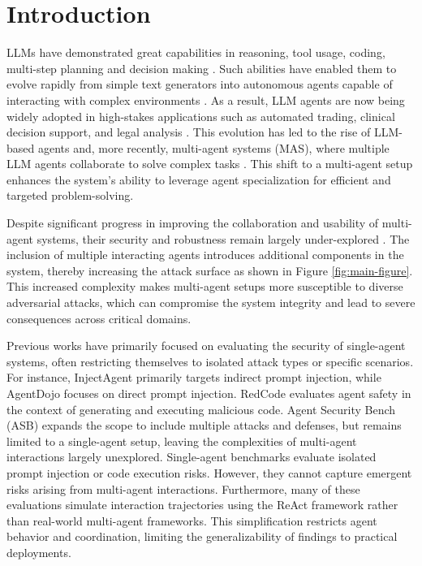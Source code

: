 \section{Introduction}

LLMs have demonstrated great capabilities in  reasoning, tool usage, coding, multi-step planning and decision making \citep{Masterman2024TheLO, wu2023autogen}. Such abilities have enabled them to evolve rapidly from simple text generators into autonomous agents capable of interacting with complex environments \citep{li2024personalllmagentsinsights,liu2025advanceschallengesfoundationagents,schick2023toolformerlanguagemodelsteach}.  As a result, LLM agents are now being widely adopted in high-stakes applications such as automated trading, clinical decision support, and legal analysis \citep{10.1145/3677052.3698688, 10822186, li2024legalagentbenchevaluatingllmagents}. This evolution has led to the rise of LLM-based agents and, more recently, multi-agent systems (MAS), where multiple LLM agents collaborate to solve complex tasks \citep{article, 10546975}. This shift to a multi-agent setup enhances the system’s ability to leverage agent specialization for efficient and targeted problem-solving.

Despite significant progress in improving the collaboration and usability of multi-agent systems, their security and robustness remain largely under-explored \citep{hammond2025multiagentrisksadvancedai}. The inclusion of multiple interacting agents introduces additional components in the system, thereby increasing the attack surface as shown in Figure \ref{fig:main-figure}. This increased complexity makes multi-agent setups more susceptible to diverse adversarial attacks, which can compromise the system integrity and lead to severe consequences across critical domains.

Previous works \citep{zhang2025agentsecuritybenchasb, ruan2024identifyingriskslmagents} have primarily focused on evaluating the security of single-agent systems, often restricting themselves to isolated attack types or specific scenarios. For instance, InjectAgent \citep{zhan2024injecagentbenchmarkingindirectprompt} primarily targets indirect prompt injection, while AgentDojo \citep{debenedetti2024agentdojodynamicenvironmentevaluate} focuses on direct prompt injection. RedCode \citep{guo2024redcoderiskycodeexecution} evaluates agent safety in the context of generating and executing malicious code. Agent Security Bench (ASB) \citep{zhang2025agentsecuritybenchasb} expands the scope to include multiple attacks and defenses, but remains limited to a single-agent setup, leaving the complexities of multi-agent interactions largely unexplored. Single-agent benchmarks evaluate isolated prompt injection or code execution risks. However, they cannot capture emergent risks arising from multi-agent interactions. Furthermore, many of these evaluations simulate interaction trajectories using the ReAct framework \citep{yuan2024rjudgebenchmarkingsafetyrisk} rather than real-world multi-agent frameworks. This simplification restricts agent behavior and coordination, limiting the generalizability of findings to practical deployments. 

